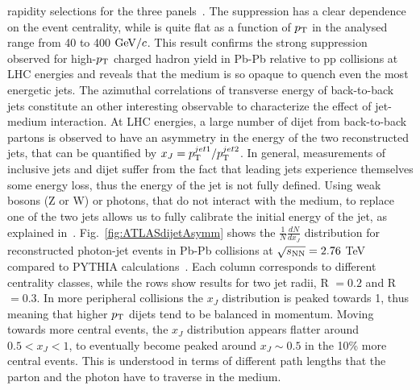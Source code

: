 rapidity selections for the three panels~\cite{Aad:2014bxa}. The 
suppression has a clear dependence on the event centrality, while 
is quite flat as a function of $p_{\rm T}$ in the analysed range from 40 to 400 $\mathrm{GeV}/c$. 
This result confirms the strong suppression observed for high-$p_{\rm T}$ 
charged hadron yield in Pb-Pb relative to pp collisions at LHC energies and reveals that the 
medium is so opaque to quench even the most energetic jets. The 
azimuthal correlations of transverse energy of back-to-back jets 
constitute an other interesting observable to characterize the effect 
of jet-medium interaction. At LHC energies, a large number of dijet 
from back-to-back partons is observed to have an asymmetry in the energy 
of the two reconstructed jets, that can be quantified by 
$x_J = p_{\rm T}^{jet1}/p_{\rm T}^{jet2}$. 
In general, measurements of inclusive jets and dijet suffer from the fact that leading jets 
experience themselves some energy loss, thus the energy of the jet is not 
fully defined. Using weak bosons (Z or W) or photons, that do not interact 
with the medium, to replace one of the two jets allows us to fully calibrate the 
initial energy of the jet, as explained in~\cite{Wang:1996yh}. 
Fig.~\ref{fig:ATLASdijetAsymm} shows the $\frac{1}{N}\frac{dN}{dx_J}$ 
distribution for reconstructed photon-jet events in Pb-Pb collisions at $\sqrt{s_{\rm NN}} = 2.76$ TeV 
compared to PYTHIA calculations~\cite{ATLAS-CONF-2012-121}. 
Each column corresponds to different centrality classes, while the 
rows show results for two jet radii, R $= 0.2$ and R $=0.3$. In more 
peripheral collisions the $x_J$ distribution is peaked towards 1, thus 
meaning that higher $p_{\rm T}$ dijets tend to be balanced in momentum. 
Moving towards more central events, the $x_J$ distribution appears 
flatter around $0.5 < x_J<1$, to eventually become peaked around 
$x_J \sim 0.5$ in the 10\% more central events.
This is understood in terms of different path 
lengths that the parton and the photon have to traverse in the medium. 
